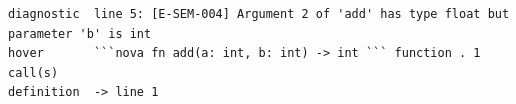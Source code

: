 \begin{lstlisting}[]
diagnostic  line 5: [E-SEM-004] Argument 2 of 'add' has type float but parameter 'b' is int
hover       ```nova fn add(a: int, b: int) -> int ``` function . 1 call(s)
definition  -> line 1
\end{lstlisting}

